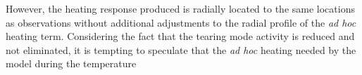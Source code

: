 However, the heating response produced is radially located to the same locations as observations without additional adjustments to the radial profile of the \textit{ad hoc} heating term. Considering the fact that the tearing mode activity is reduced and not eliminated, it is tempting to speculate that the \textit{ad hoc} heating needed by the model during the temperature 